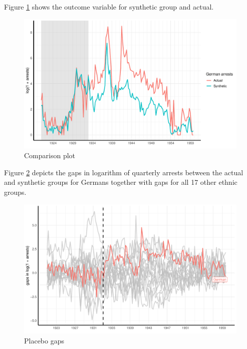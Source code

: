 
Figure \ref{fig_sc_comp_plot} shows the outcome variable for synthetic group and actual.  
\begin{figure}[h]
\centering
\includegraphics[width=\textwidth]{plots/synthetic_control/comparison_plot.pdf}
\caption{Comparison plot}
\label{fig_sc_comp_plot}
\end{figure}

Figure \ref{fig_sc_placebo_gaps} depicts the gaps in logarithm of quarterly arrests between the actual and synthetic groups for Germans together with gaps for all 17 other ethnic groups. 
\begin{figure}[h]
\centering
\includegraphics[width=\textwidth]{plots/synthetic_control/placebo_highlight_all.pdf}
\caption{Placebo gaps}
\label{fig_sc_placebo_gaps}
\end{figure}

